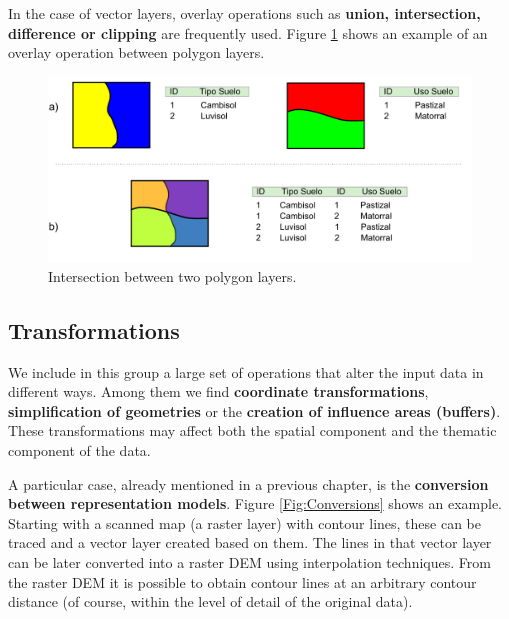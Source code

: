 In the case of vector layers, overlay operations such as \textbf{union, intersection, difference or clipping} are frequently used. Figure \ref{Fig:Intersection} shows an example of an overlay operation between polygon layers.

\begin{figure}[!hbt]   
\centering
\includegraphics[width= \columnwidth]{Analysis/Intersection.pdf}
\caption{\small Intersection between two polygon layers.}
\label{Fig:Intersection} 
\end{figure}

\subsection{Transformations}

We include in this group a large set of operations that alter the input data in different ways. Among them we find \textbf{coordinate transformations}, \textbf{simplification of geometries} or the \textbf{creation of influence areas (buffers)}. These transformations may affect both the spatial component and the thematic component of the data. 

A particular case, already mentioned in a previous chapter, is the \textbf{conversion between representation models}. Figure \ref{Fig:Conversions} shows an example. Starting with a scanned map (a raster layer) with contour lines, these can be traced and a vector layer created based on them. The lines in that vector layer can be later converted into a raster DEM using interpolation techniques. From the raster DEM it is possible to obtain contour lines at an arbitrary contour distance (of course, within the level of detail of the original data).

